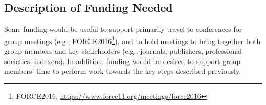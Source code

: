 \subsection{Description of Funding Needed}

Some funding would be useful to support primarily travel to conferences for group meetings (e.g., FORCE2016\footnote{FORCE2016, \url{https://www.force11.org/meetings/force2016}}), and to hold meetings to bring together both group members and key stakeholders (e.g., journals, publishers, professional societies, indexers).
In addition, funding would be desired to support group members' time to perform work towards the key steps described previously.
